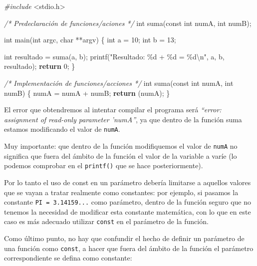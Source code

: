 \documentclass[
]{book}
\newenvironment{Shaded}{\begin{snugshade}}{\end{snugshade}}
\newcommand{\CommentTok}[1]{\textcolor[rgb]{0.56,0.35,0.01}{\textit{#1}}}
\newcommand{\ControlFlowTok}[1]{\textcolor[rgb]{0.13,0.29,0.53}{\textbf{#1}}}
\newcommand{\DataTypeTok}[1]{\textcolor[rgb]{0.13,0.29,0.53}{#1}}
\newcommand{\DecValTok}[1]{\textcolor[rgb]{0.00,0.00,0.81}{#1}}
\newcommand{\ImportTok}[1]{#1}
\newcommand{\NormalTok}[1]{#1}
\newcommand{\PreprocessorTok}[1]{\textcolor[rgb]{0.56,0.35,0.01}{\textit{#1}}}
\newcommand{\SpecialCharTok}[1]{\textcolor[rgb]{0.00,0.00,0.00}{#1}}
\newcommand{\StringTok}[1]{\textcolor[rgb]{0.31,0.60,0.02}{#1}}
\begin{document}
\begin{Shaded}
\begin{Highlighting}[]
\PreprocessorTok{\#include }\ImportTok{\textless{}stdio.h\textgreater{}}

\CommentTok{/* Predeclaración de funciones/aciones */}
\DataTypeTok{int}\NormalTok{ suma(}\DataTypeTok{const} \DataTypeTok{int}\NormalTok{ numA, }\DataTypeTok{int}\NormalTok{ numB);}

\DataTypeTok{int}\NormalTok{ main(}\DataTypeTok{int}\NormalTok{ argc, }\DataTypeTok{char}\NormalTok{ **argv) \{}
    \DataTypeTok{int}\NormalTok{ a = }\DecValTok{10}\NormalTok{;}
    \DataTypeTok{int}\NormalTok{ b = }\DecValTok{13}\NormalTok{;}

    \DataTypeTok{int}\NormalTok{ resultado = suma(a, b);}
\NormalTok{    printf(}\StringTok{"Resultado: \%d + \%d = \%d}\SpecialCharTok{\textbackslash{}n}\StringTok{"}\NormalTok{, a, b, resultado);}
    \ControlFlowTok{return} \DecValTok{0}\NormalTok{;}
\NormalTok{\}}

\CommentTok{/* Implementación de funciones/acciones */}
\DataTypeTok{int}\NormalTok{ suma(}\DataTypeTok{const} \DataTypeTok{int}\NormalTok{ numA, }\DataTypeTok{int}\NormalTok{ numB) \{}
\NormalTok{    numA = numA + numB;}
    \ControlFlowTok{return}\NormalTok{ (numA);}
\NormalTok{\}}
\end{Highlighting}
\end{Shaded}

El error que obtendremos al intentar compilar el programa será \emph{``error: assignment of read-only parameter 'numA''}, ya que dentro de la función suma estamos modificando el valor de \texttt{numA}.

Muy importante: que dentro de la función modifiquemos el valor de \texttt{numA} no significa que fuera del ámbito de la función el valor de la variable a varíe (lo podemos comprobar en el \texttt{printf()} que se hace posteriormente).

Por lo tanto el uso de const en un parámetro debería limitarse a aquellos valores que se vayan a tratar realmente como constantes: por ejemplo, si pasamos la constante \texttt{PI\ =\ 3.14159...} como parámetro, dentro de la función seguro que no tenemos la necesidad de modificar esta constante matemática, con lo que en este caso es más adecuado utilizar \texttt{const} en el parámetro de la función.

Como último punto, no hay que confundir el hecho de definir un parámetro de una función como \texttt{const}, a hacer que fuera del ámbito de la función el parámetro correspondiente se defina como constante:
\end{document}
